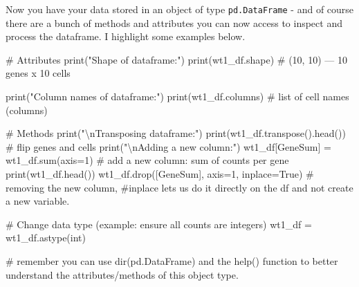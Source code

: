 \documentclass[
  letterpaper,
  DIV=11,
  numbers=noendperiod]{scrartcl}
\newenvironment{Shaded}{\begin{snugshade}}{\end{snugshade}}
\newcommand{\BuiltInTok}[1]{\textcolor[rgb]{0.00,0.23,0.31}{#1}}
\newcommand{\CharTok}[1]{\textcolor[rgb]{0.13,0.47,0.30}{#1}}
\newcommand{\CommentTok}[1]{\textcolor[rgb]{0.37,0.37,0.37}{#1}}
\newcommand{\DecValTok}[1]{\textcolor[rgb]{0.68,0.00,0.00}{#1}}
\newcommand{\NormalTok}[1]{\textcolor[rgb]{0.00,0.23,0.31}{#1}}
\newcommand{\OperatorTok}[1]{\textcolor[rgb]{0.37,0.37,0.37}{#1}}
\newcommand{\StringTok}[1]{\textcolor[rgb]{0.13,0.47,0.30}{#1}}
\newcommand{\VariableTok}[1]{\textcolor[rgb]{0.07,0.07,0.07}{#1}}
\begin{document}
Now you have your data stored in an object of type \texttt{pd.DataFrame}
- and of course there are a bunch of methods and attributes you can now
access to inspect and process the dataframe. I highlight some examples
below.

\begin{Shaded}
\begin{Highlighting}[]
\CommentTok{\# Attributes}
\BuiltInTok{print}\NormalTok{(}\StringTok{"Shape of dataframe:"}\NormalTok{)}
\BuiltInTok{print}\NormalTok{(wt1\_df.shape)    }\CommentTok{\# (10, 10) — 10 genes x 10 cells}

\BuiltInTok{print}\NormalTok{(}\StringTok{"Column names of dataframe:"}\NormalTok{)}
\BuiltInTok{print}\NormalTok{(wt1\_df.columns)  }\CommentTok{\# list of cell names (columns)}

\CommentTok{\# Methods}
\BuiltInTok{print}\NormalTok{(}\StringTok{"}\CharTok{\textbackslash{}n}\StringTok{Transposing dataframe:"}\NormalTok{)}
\BuiltInTok{print}\NormalTok{(wt1\_df.transpose().head()) }\CommentTok{\# flip genes and cells}
\BuiltInTok{print}\NormalTok{(}\StringTok{"}\CharTok{\textbackslash{}n}\StringTok{Adding a new column:"}\NormalTok{)}
\NormalTok{wt1\_df[}\StringTok{\textquotesingle{}GeneSum\textquotesingle{}}\NormalTok{] }\OperatorTok{=}\NormalTok{ wt1\_df.}\BuiltInTok{sum}\NormalTok{(axis}\OperatorTok{=}\DecValTok{1}\NormalTok{) }\CommentTok{\# add a new column: sum of counts per gene}
\BuiltInTok{print}\NormalTok{(wt1\_df.head())}
\NormalTok{wt1\_df.drop([}\StringTok{\textquotesingle{}GeneSum\textquotesingle{}}\NormalTok{], axis}\OperatorTok{=}\DecValTok{1}\NormalTok{, inplace}\OperatorTok{=}\VariableTok{True}\NormalTok{) }\CommentTok{\# removing the new column, \#inplace lets us do it directly on the df and not create a new variable.}

\CommentTok{\# Change data type (example: ensure all counts are integers)}
\NormalTok{wt1\_df }\OperatorTok{=}\NormalTok{ wt1\_df.astype(}\BuiltInTok{int}\NormalTok{)}

\CommentTok{\# remember you can use dir(pd.DataFrame) and the help() function to better understand the attributes/methods of this object type.}
\end{Highlighting}
\end{Shaded}
\end{document}
